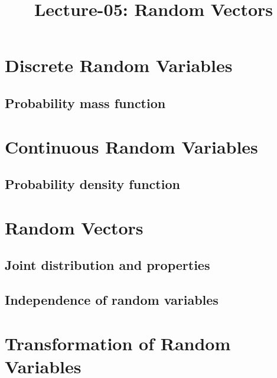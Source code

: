 \documentclass[a4paper,10pt,english]{article}
\title{Lecture-05: Random Vectors}
\author{}
\begin{document}
\maketitle

\section{Discrete Random Variables} 
\subsection{Probability mass function} 
\section{Continuous Random Variables}
\subsection{Probability density function}

\section{Random Vectors}
\subsection{Joint distribution and properties}
\subsection{Independence of random variables}
\section{Transformation of Random Variables}
\end{document}
